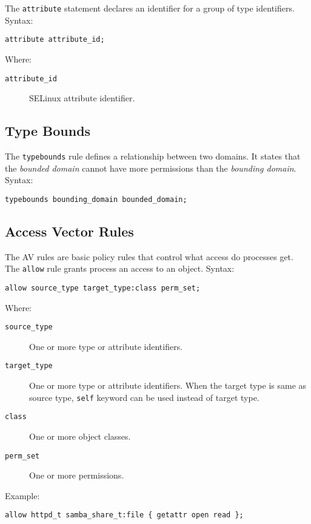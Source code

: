 The \texttt{attribute} statement declares an identifier for a group of type
identifiers. Syntax:
\begin{lstlisting}
attribute attribute_id;
\end{lstlisting}
Where:
\begin{description}
    \item [\texttt{attribute\_id}] SELinux attribute identifier.
\end{description}



\subsection{Type Bounds}

The \texttt{typebounds} rule defines a relationship between two domains. It
states that the \emph{bounded domain} cannot have more permissions than the
\emph{bounding domain}. Syntax:
\begin{lstlisting}
typebounds bounding_domain bounded_domain;
\end{lstlisting}

\subsection{Access Vector Rules}

The AV rules are basic policy rules that control what access do processes get.
The \texttt{allow} rule grants process an access to an object. Syntax:
\begin{lstlisting}
allow source_type target_type:class perm_set;
\end{lstlisting}
Where:
\begin{description}
    \item [\texttt{source\_type}] One or more type or attribute identifiers.
    \item [\texttt{target\_type}] One or more type or attribute identifiers.
        When the target type is same as source type, \texttt{self} keyword can
        be used instead of target type.
    \item [\texttt{class}] One or more object classes.
    \item [\texttt{perm\_set}] One or more permissions.
\end{description}
Example:
\begin{lstlisting}
allow httpd_t samba_share_t:file { getattr open read };
\end{lstlisting}

